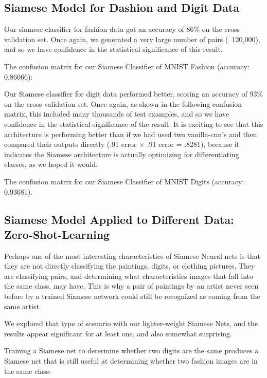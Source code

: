 \documentclass[a4paper, 11pt]{article}
\begin{document}
\subsection{Siamese Model for Dashion and Digit Data}

Our siamese classifier for fashion data got an accuracy of 86\% on the cross validation set. Once again, we generated a very large number of pairs (~120,000), and so we have confidence in the statistical significance of this result. 

The confusion matrix for our Siamese Classifier of MNIST Fashion (accuracy: 0.86066):


Our Siamese classifier for digit data performed better, scoring an accuracy of 93\% on the cross validation set. Once again, as shown in the following confusion matrix, this included many thousands of test examples, and so we have confidence in the statistical significance of the result. It is exciting to see that this architecture is performing better than if we had used two vanilla-cnn’s and then compared their outputs directly (.91 error $\times$ .91 error = .8281), because it indicates the Siamese architecture is actually optimizing for differentiating classes, as we hoped it would.

The confusion matrix for our Siamese Classifier of MNIST Digits (accuracy: 0.93681).


\subsection{Siamese Model Applied to Different Data: Zero-Shot-Learning}

Perhaps one of the most interesting characteristics of Siamese Neural nets is that they are not directly classifying the paintings, digits, or clothing pictures. They are classifying pairs, and determining what characteristics images that fall into the same class, may have. This is why a pair of paintings by an artist never seen before by a trained Siamese network could still be recognized as coming from the same artist.

We explored that type of scenario with our lighter-weight Siamese Nets, and the results appear significant for at least one, and also somewhat surprising.

Training a Siamese net to determine whether two digits are the same produces a Siamese net that is still useful at determining whether two fashion images are in the same class:
\end{document}
